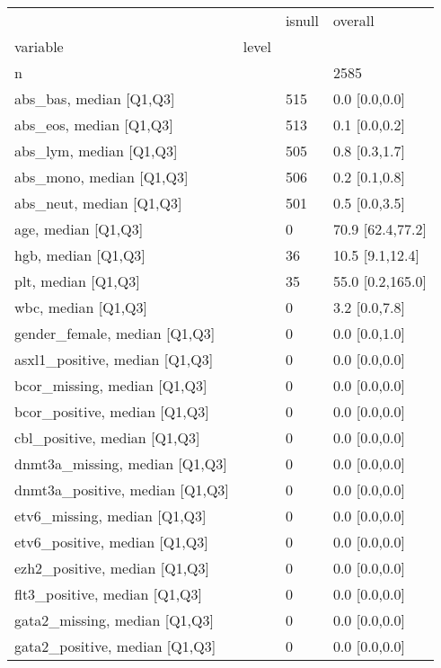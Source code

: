 \begin{tabular}{llll}
\toprule
                 &    & isnull &           overall \\
variable & level &        &                   \\
\midrule
n &    &        &              2585 \\
abs\_bas, median [Q1,Q3] &    &    515 &     0.0 [0.0,0.0] \\
abs\_eos, median [Q1,Q3] &    &    513 &     0.1 [0.0,0.2] \\
abs\_lym, median [Q1,Q3] &    &    505 &     0.8 [0.3,1.7] \\
abs\_mono, median [Q1,Q3] &    &    506 &     0.2 [0.1,0.8] \\
abs\_neut, median [Q1,Q3] &    &    501 &     0.5 [0.0,3.5] \\
age, median [Q1,Q3] &    &      0 &  70.9 [62.4,77.2] \\
hgb, median [Q1,Q3] &    &     36 &   10.5 [9.1,12.4] \\
plt, median [Q1,Q3] &    &     35 &  55.0 [0.2,165.0] \\
wbc, median [Q1,Q3] &    &      0 &     3.2 [0.0,7.8] \\
gender\_female, median [Q1,Q3] &    &      0 &     0.0 [0.0,1.0] \\
asxl1\_positive, median [Q1,Q3] &    &      0 &     0.0 [0.0,0.0] \\
bcor\_missing, median [Q1,Q3] &    &      0 &     0.0 [0.0,0.0] \\
bcor\_positive, median [Q1,Q3] &    &      0 &     0.0 [0.0,0.0] \\
cbl\_positive, median [Q1,Q3] &    &      0 &     0.0 [0.0,0.0] \\
dnmt3a\_missing, median [Q1,Q3] &    &      0 &     0.0 [0.0,0.0] \\
dnmt3a\_positive, median [Q1,Q3] &    &      0 &     0.0 [0.0,0.0] \\
etv6\_missing, median [Q1,Q3] &    &      0 &     0.0 [0.0,0.0] \\
etv6\_positive, median [Q1,Q3] &    &      0 &     0.0 [0.0,0.0] \\
ezh2\_positive, median [Q1,Q3] &    &      0 &     0.0 [0.0,0.0] \\
flt3\_positive, median [Q1,Q3] &    &      0 &     0.0 [0.0,0.0] \\
gata2\_missing, median [Q1,Q3] &    &      0 &     0.0 [0.0,0.0] \\
gata2\_positive, median [Q1,Q3] &    &      0 &     0.0 [0.0,0.0] \\

\end{tabular}
